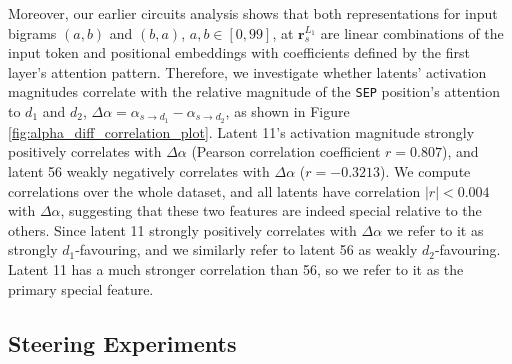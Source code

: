
Moreover, our earlier circuits analysis shows that both representations for input bigrams $(a,b)$ and $(b,a)$, $a,b \in [0,99]$, at $\boldsymbol r_{s}^{L_1}$ are linear combinations of the input token and positional embeddings with coefficients defined by the first layer's attention pattern.
Therefore, we investigate whether latents' activation magnitudes correlate with the relative magnitude of the \texttt{SEP} position's attention to $d_1$ and $d_2$,
\( 
\Delta \alpha = \alpha_{s \to d_1} - 
\alpha_{s \to d_2}
\), as shown in Figure \ref{fig:alpha_diff_correlation_plot}. %
Latent 11's activation magnitude strongly positively correlates with $\Delta \alpha$ (Pearson correlation coefficient $r=0.807$), and latent 56 weakly negatively correlates with $\Delta \alpha$ ($r=-0.3213$). We compute correlations over the whole dataset, and all latents have correlation $|r| < 0.004$ with $\Delta \alpha$, suggesting that these two features are indeed special relative to the others.
Since latent 11 strongly positively correlates with $\Delta \alpha$ we refer to it as strongly $d_1$-favouring, and we similarly refer to latent 56 as weakly $d_2$-favouring. Latent 11 has a much stronger correlation than 56, so we refer to it as the primary special feature.

\subsection{Steering Experiments}\label{ss:steering_exp}

